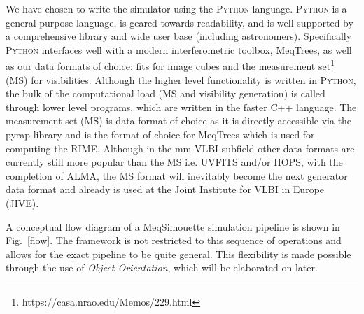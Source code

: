 We have chosen to write the simulator using the \textsc{Python} language. \textsc{Python} is a general purpose language, is geared towards readability, and is well supported by a comprehensive library and wide user base (including astronomers). Specifically \textsc{Python} interfaces well with a modern interferometric toolbox, {\sc MeqTrees}, as well as our data formats of choice: {\sc fits} for image cubes and the {\sc measurement set}\footnote{https://casa.nrao.edu/Memos/229.html} (MS) for visibilities. Although the higher level functionality is written in \textsc{Python}, the bulk of the computational load (MS and visibility generation) is called through lower level programs, which are written in the faster {\sc C++} language. 
The {\sc measurement set} (MS) is data format of choice as it is directly accessible via the {\sc pyrap} library and is the format of choice for {\sc MeqTrees} which is used for computing the RIME. Although in the mm-VLBI subfield other data formats are currently still more popular than the MS i.e. {\sc UVFITS} and/or {\sc HOPS}, with the completion of ALMA, the MS format will inevitably become the next generator data format and already is used at the Joint Institute for VLBI in Europe (JIVE). 




A conceptual flow diagram of a {\sc MeqSilhouette} simulation pipeline is shown in Fig.~\ref{flow}. The framework is not restricted to this sequence of operations and allows for the exact pipeline to be quite general. This flexibility is made possible through the use of \emph{Object-Orientation}, which will be elaborated on later.

